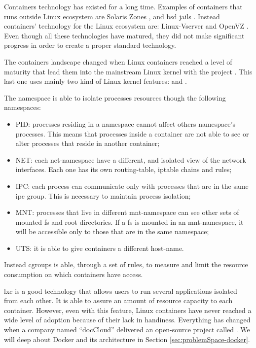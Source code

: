 Containers technology has existed for a long time. Examples of containers that runs outside Linux
ecosystem are Solaris Zones \cite{solarisContainers}, and \acs{bsd} jails \cite{bsdContainers}.
Instead containers' technology for the Linux ecosystem are: Linux-Vserver \cite{vserverContainers}
and OpenVZ \cite{openvzContainers}. Even though all these technologies have matured, they did not make
significant progress in order to create a proper standard technology.

The containers landscape changed when Linux containers reached a level of maturity that lead them 
into the mainstream Linux kernel with the project . This last one uses mainly two
kind of Linux kernel features:  and .

The namespace is able to isolate processes resources though the following namespaces:

\begin{itemize}
	\item{PID: processes residing in a namespace cannot affect others namespace's processes. This
		means that processes inside a container are not able to see or alter processes that reside in
		another container;}
	\item{NET: each net-namespace have a different, and isolated view of the network interfaces. Each
		one has its own routing-table, iptable chains and rules;}
	\item{IPC: each process can communicate only with processes that are in the same \ac{ipc} group. This
		is necessary to maintain process isolation;}
	\item{MNT: processes that live in different mnt-namespace can see other sets of mounted \ac{fs} and
		root directories. If a \ac{fs} is mounted in an mnt-namespace, it will be accessible only to those
		that are in the same namespace;}
	\item{UTS: it is able to give containers a different host-name.}
\end{itemize}

Instead cgroups is able, through a set of rules, to measure and limit the resource consumption on which
containers have access.

\ac{lxc} is a good technology that allows users to run several applications isolated from each other. It
is able to assure an amount of resource capacity to each container. However, even with this feature,
Linux containers have never reached a wide level of adoption because of their lack in handiness. Everything
has changed when a company named ``docCloud'' delivered an open-source project called .
We will deep about Docker and its architecture in Section \ref{sec:problemSpace-docker}.

